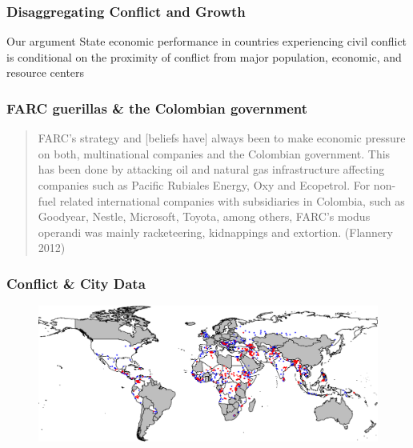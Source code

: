 \begin{frame}
\frametitle{Disaggregating Conflict and Growth}

\begin{block}{Our argument}
State economic performance in countries experiencing civil conflict is conditional on the proximity of conflict from major population, economic, and resource centers
\end{block}

\end{frame}

\begin{frame}
\frametitle{FARC guerillas \& the Colombian government}

\begin{quote}FARC's strategy and [beliefs have] always been to make economic pressure on both, multinational companies and the Colombian government. This has been done by attacking oil and natural gas infrastructure affecting companies such as Pacific Rubiales Energy, Oxy and Ecopetrol. For non-fuel related international companies with subsidiaries in Colombia, such as Goodyear, Nestle, Microsoft, Toyota, among others, FARC’s modus operandi was mainly racketeering, kidnappings and extortion. (Flannery 2012)\end{quote}

\end{frame}

\begin{frame}
\frametitle{Conflict \& City Data}

\vspace{-0.25cm}
\begin{figure}[ht]
  \centering
  \includegraphics[width=1\textwidth]{CityConfMap-crop}
\end{figure}

\end{frame}

